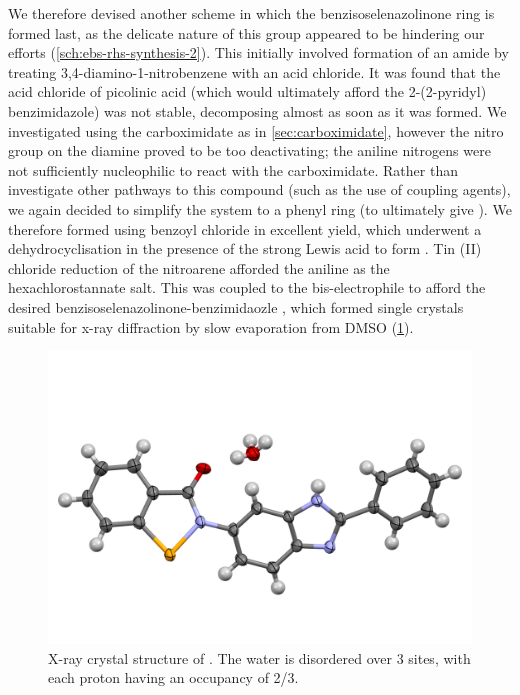 \begin{refsection}
We therefore devised another scheme in which the benzisoselenazolinone ring is formed last, as the delicate nature of this group appeared to be hindering our efforts (\cref{sch:ebs-rhs-synthesis-2}).
This initially involved formation of an amide  by treating 3,4-diamino-1-nitrobenzene with an acid chloride.
It was found that the acid chloride of picolinic acid (which would ultimately afford the 2-(2-pyridyl) benzimidazole) was not stable, decomposing almost as soon as it was formed.
We investigated using the carboximidate as in \cref{sec:carboximidate}, however the nitro group on the diamine proved to be too deactivating; the aniline nitrogens were not sufficiently nucleophilic to react with the carboximidate.
Rather than investigate other pathways to this compound (such as the use of coupling agents), we again decided to simplify the system to a phenyl ring (to ultimately give ).
We therefore formed  using benzoyl chloride in excellent yield, which underwent a dehydrocyclisation in the presence of the strong Lewis acid  to form .
Tin (II) chloride reduction of the nitroarene  afforded the aniline  as the hexachlorostannate salt.
This was coupled to the bis-electrophile  to afford the desired benzisoselenazolinone-benzimidaozle , which formed single crystals suitable for x-ray diffraction by slow evaporation from DMSO (\cref{fig:ebs-rhs-xray}).

\begin{figure}[ht]
    \centering
    \includegraphics[width=0.8\linewidth]{Figures/ebs-rhs-xray.pdf}
    \caption{X-ray crystal structure of . The water is disordered over 3 sites, with each proton having an occupancy of 2/3.}
    \label{fig:ebs-rhs-xray}
\end{figure}


\end{refsection}
